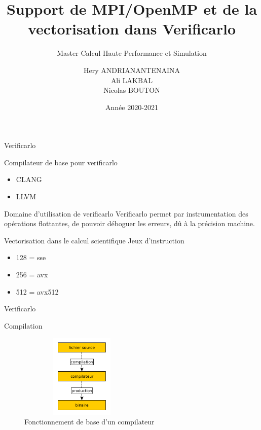 \documentclass{beamer}
\title[Support pour Verificarlo]{Support de MPI/OpenMP et de la vectorisation dans Verificarlo}
\subtitle{Master Calcul Haute Performance et Simulation}
\author[Hery, Ali, Nicolas]{Hery ANDRIANANTENAINA \\ Ali LAKBAL \\ Nicolas BOUTON}
\institute{\textbf{Encadrant:} Eric PETIT}
\date{Année 2020-2021}
\begin{document}
\maketitle

\begin{frame}{Verificarlo}
    \begin{block}{Compilateur de base pour verificarlo}
      \begin{itemize}
          \item CLANG
          \item LLVM
      \end{itemize}
    \end{block}
  \begin{block}{Domaine d'utilisation de verificarlo}
    Verificarlo permet par instrumentation des opérations flottantes, de pouvoir déboguer les erreurs, dû à la précision machine.
  \end{block}
  \begin{block}{Vectorisation dans le calcul scientifique}
    Jeux d'instruction 
        \begin{itemize}
            \item 128 = sse
            \item 256 = avx
            \item 512 = avx512
        \end{itemize}
  \end{block}
\end{frame}

\begin{frame}{Verificarlo}
    \begin{block}{Compilation}
      \begin{figure}
          \centering
          \includegraphics[width=6cm,height=4cm]{../ressources/compilation.png}
          \caption{Fonctionnement de base d'un compilateur}
          \label{fig:my_label}
      \end{figure}
    \end{block}
\end{frame}
\end{document}
